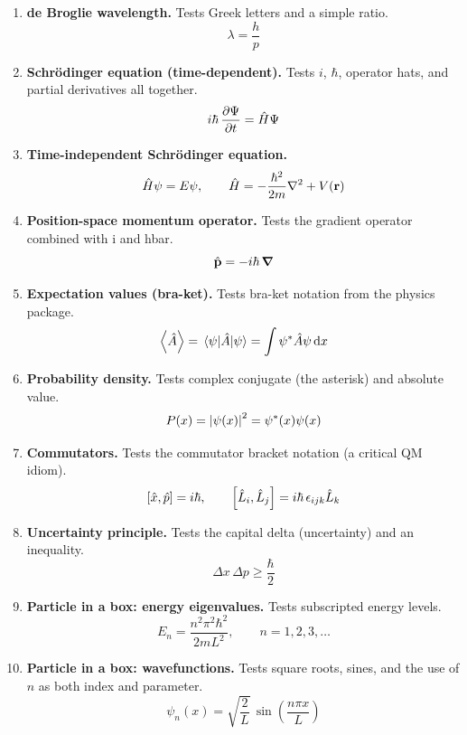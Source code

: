 \documentclass[11pt]{article}
\begin{document}
\begin{enumerate}

\item \textbf{de Broglie wavelength.}
Tests Greek letters and a simple ratio.
\[
  \lambda = \frac{h}{p}
\]

\item \textbf{Schr\"{o}dinger equation (time-dependent).}
Tests $i$, $\hbar$, operator hats, and partial derivatives all together.
\[
  i\hbar\,\pdv{\Psi}{t} = \hat{H}\Psi
\]

\item \textbf{Time-independent Schr\"odinger equation.}
\[
  \hat{H}\psi = E\psi, \qquad
  \hat{H} = -\frac{\hbar^2}{2m}\laplacian + V(\vb{r})
\]

\item \textbf{Position-space momentum operator.}
Tests the gradient operator combined with i and hbar.
\[
  \hat{\vb{p}} = -i\hbar\,\grad
\]

\item \textbf{Expectation values (bra-ket).}
Tests bra-ket notation from the physics package.
\[
  \ev{\hat{A}} = \mel{\psi}{\hat{A}}{\psi}
  = \int \psi^* \hat{A} \psi \dd{x}
\]

\item \textbf{Probability density.}
Tests complex conjugate (the asterisk) and absolute value.
\[
  P(x) = \abs{\psi(x)}^2 = \psi^*(x)\psi(x)
\]

\item \textbf{Commutators.}
Tests the commutator bracket notation (a critical QM idiom).
\[
  \comm{\hat{x}}{\hat{p}} = i\hbar, \qquad
  \comm{\hat{L}_i}{\hat{L}_j} = i\hbar\,\epsilon_{ijk}\hat{L}_k
\]

\item \textbf{Uncertainty principle.}
Tests the capital delta (uncertainty) and an inequality.
\[
  \Delta x \, \Delta p \geq \frac{\hbar}{2}
\]

\item \textbf{Particle in a box: energy eigenvalues.}
Tests subscripted energy levels.
\[
  E_n = \frac{n^2 \pi^2 \hbar^2}{2mL^2}, \qquad n = 1, 2, 3, \ldots
\]

\item \textbf{Particle in a box: wavefunctions.}
Tests square roots, sines, and the use of $n$ as both index and parameter.
\[
  \psi_n(x) = \sqrt{\frac{2}{L}}\,\sin\!\left(\frac{n\pi x}{L}\right)
\]

\end{enumerate}
\end{document}
